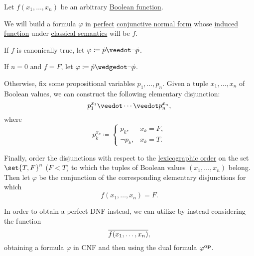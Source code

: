 \begin{algorithm}\label{alg:perfect_cnf_and_dnf}
  Let \( f(x_1, \ldots, x_n) \) be an arbitrary \hyperref[def:boolean_function]{Boolean function}.

  We will build a formula \( \varphi \) in \hyperref[def:perfect_cnf_and_dnf]{perfect} \hyperref[def:cnf_and_dnf]{conjunctive normal form} whose \hyperref[def:propositional_valuation/valuation_function]{induced function} under \hyperref[def:propositional_semantics]{classical semantics} will be \( f \).

  \begin{thmenum}
     If \( f \) is canonically true, let \( \varphi \coloneqq \syn p \synvee \neg \syn p \).

     If \( n = 0 \) and \( f = F \), let \( \varphi \coloneqq \syn p \synwedge \neg \syn p \).

     Otherwise, fix some propositional variables \( p_1, \ldots, p_n \). Given a tuple \( x_1, \ldots, x_n \) of Boolean values, we can construct the following elementary disjunction:
    \begin{equation}\label{alg:perfect_cnf_and_dnf/cnf}
      p_1^{x_1} \synvee \cdots \synvee p_n^{x_n},
    \end{equation}
    where
    \begin{equation*}
      p_k^{x_k} \coloneqq \begin{cases}
        p_k,      &x_k = F, \\
        \neg p_k, &x_k = T.
      \end{cases}
    \end{equation*}

     Finally, order the disjunctions with respect to the \hyperref[def:lexicographic_order]{lexicographic order} on the set \( \set{ T, F }^n \) (\( F < T \)) to which the tuples of Boolean values \( (x_1, \ldots, x_n) \) belong. Then let \( \varphi \) be the conjunction of the corresponding elementary disjunctions for which
    \begin{equation*}
      f(x_1, \ldots, x_n) = F.
    \end{equation*}

     In order to obtain a perfect DNF instead, we can utilize  by instead considering the function
    \begin{equation*}
      \oline{f(x_1, \ldots, x_n)},
    \end{equation*}
    obtaining a formula \( \varphi \) in CNF and then using the dual formula \( \varphi^\oppos \).
  \end{thmenum}
\end{algorithm}
